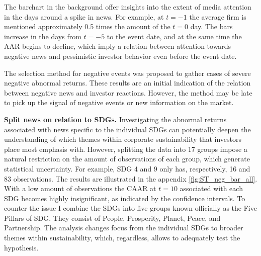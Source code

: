  
The barchart in the background offer insights into the extent of media attention in the days around a spike in news. For example, at $t = -1$ the average firm is mentioned approximately 0.5 times the amount of the $t = 0$ day. The bars increase in the days from $t=-5$ to the event date, and at the same time the AAR begins to decline, which imply a relation between attention towards negative news and pessimistic investor behavior even before the event date. 

The selection method for negative events was proposed to gather cases of severe negative abnormal returns. These results are an initial indication of the relation between negative news and investor reactions. However, the method may be late to pick up the signal of negative events or new information on the market.  


\noindent \textbf{Split news on relation to SDGs.} Investigating the abnormal returns associated with news specific to the individual SDGs can potentially deepen the understanding of which themes within corporate sustainability that investors place most emphasis with. However, splitting the data into 17 groups impose a natural restriction on the amount of observations of each group, which generate statistical uncertainty. For example, SDG 4 and 9 only has, respectively, 16 and 83 observations. The results are illustrated in the appendix \ref{fig:ST_neg_bar_all}. With a low amount of observations the CAAR at $t = 10$ associated with each SDG becomes highly insignificant, as indicated by the confidence intervals. To counter the issue I combine the SDGs into five groups known officially as the Five Pillars of SDG. They consist of People, Prosperity, Planet, Peace, and Partnership. The analysis changes focus from the individual SDGs to broader themes within sustainability, which, regardless, allows to adequately test the hypothesis.

